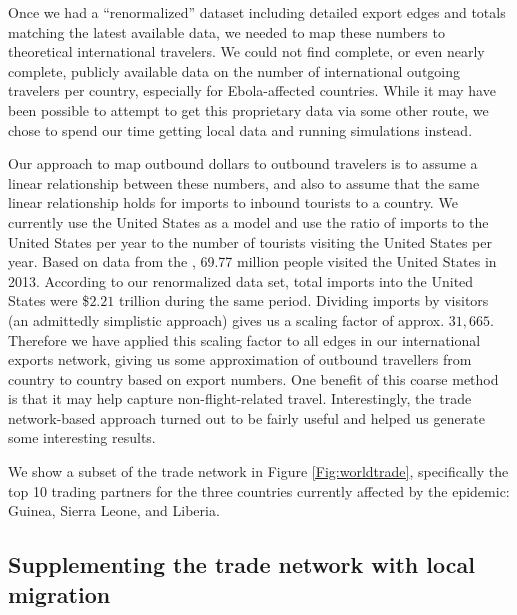 \documentclass[10pt, journal,onecolumn]{IEEEtran}
\begin{document}
Once we had a ``renormalized'' dataset including detailed export edges and totals matching
the latest available data, we needed to map these numbers to theoretical international travelers.
We could not find complete, or even nearly complete, publicly available data on the number of
international outgoing travelers per country, especially for Ebola-affected countries.
While it may have been possible to attempt to get this proprietary data via some other route,
we chose to spend our time getting local data and running simulations instead.

Our approach to map outbound dollars to outbound travelers is to assume a linear relationship
between these numbers, and also to assume that the same linear relationship holds for imports to
inbound tourists to a country.
We currently use the United States as a model and use the ratio of
imports to the United States per year to the number of tourists visiting the United States per year.
Based on data from the \citep{usinboundtourists}, 69.77 million people visited the United States in 2013.
According to our renormalized data set, total imports into the United States were
\$$2.21$ trillion during the same period. Dividing imports by visitors (an admittedly
simplistic approach) gives us a scaling factor of approx. $31,665$. Therefore we have applied this
scaling factor to all edges in our international exports network, giving us some approximation of
outbound travellers from country to country based on export numbers.
One benefit of this coarse method is that it may help capture non-flight-related
travel. Interestingly, the trade network-based approach turned out to be fairly useful and helped us generate
some interesting results.

We show a subset of the trade network in Figure \ref{Fig:worldtrade}, specifically the top 10
trading partners for the three countries currently affected by the epidemic: Guinea, Sierra Leone,
and Liberia.

\subsection{{Supplementing the trade network with local migration}}
\label{SubSec:LocalData}
\end{document}
